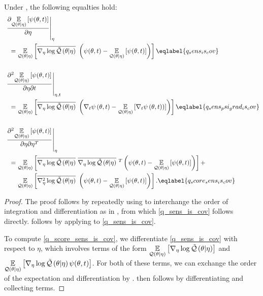 \begin{lem}
%
Under , the following equalties hold:
%
\begin{align}
%
\MoveEqLeft
\fracat{\partial \expect{\q(\theta \vert \eta)}
              {\psi(\theta, \t)}}{\partial \eta}{\eta}
\nonumber\\ \quad={}&
\expect{\q(\theta \vert \eta)}
       {\lqgradbar{\theta \vert \eta} \left(
        \psi(\theta,\t) - \expect{\q(\theta \vert \eta)}{\psi(\theta, \t)}
       \right)
       }\eqlabel{q_sens_is_cov}\\\nonumber\\
%
\MoveEqLeft
\fracat{\partial^2 \expect{\q(\theta \vert \eta)}
      {\psi(\theta, \t)}}{\partial \eta \partial \t}{\eta, \t}
\nonumber\\ \quad={}&
  \expect{\q(\theta \vert \eta)}
         {\lqgradbar{\theta \vert \eta} \left(
          \psigrad{\theta,\t} - \expect{\q(\theta \vert \eta)}{\psigrad{\theta, \t})}
         \right)
         } \eqlabel{q_sens_psi_grad_is_cov} \\\nonumber\\
 \MoveEqLeft
 \fracat{\partial^2 \expect{\q(\theta \vert \eta)}
       {\psi(\theta, \t)}}{\partial \eta \partial \eta^T}{\eta}
\nonumber\\={}&
 \expect{\q(\theta \vert \eta)}
        {\lqgradbar{\theta \vert \eta} \lqgradbar{\theta \vert \eta}^T
        \left(
         \psi(\theta,\t) - \expect{\q(\theta \vert \eta)}{\psi(\theta, \t)}
        \right)
        } +
\nonumber\\ \quad&
 \expect{\q(\theta \vert \eta)}{
        \lqhessbar{\theta \vert \eta}
        \left(
         \psi(\theta,\t) - \expect{\q(\theta \vert \eta)}{\psi(\theta, \t)}
        \right)
        }. \eqlabel{q_score_sens_is_cov}
%
\end{align}
%
\begin{proof}
%
The proof follows by repeatedly using  to interchange the order of
integration and differentiation as in  \citep[Theorem
1]{giordano:2018:covariances}, from which \eqref{q_sens_is_cov} follows
directly.   follows by applying
 to \eqref{q_sens_is_cov}.

To compute \eqref{q_score_sens_is_cov}, we differentiate \eqref{q_sens_is_cov}
with respect to $\eta$, which involves terms of the form $\underset{\mathcal{Q}(\theta
\vert \eta)}{\mathbb{E}}\left[{\nabla_\eta \log \tilde{\mathcal{Q}}}\left(\theta \vert \eta\right)\right]$ and $\underset{\mathcal{Q}(\theta \vert
\eta)}{\mathbb{E}}\left[{\nabla_\eta \log \tilde{\mathcal{Q}}}\left(\theta \vert \eta\right) \psi(\theta, t)\right]$.  For both of these terms,
we can exchange the order of the expectation and differentiation by
.   then follows by
differentiating and collecting terms.
%
\end{proof}
%
\end{lem}


